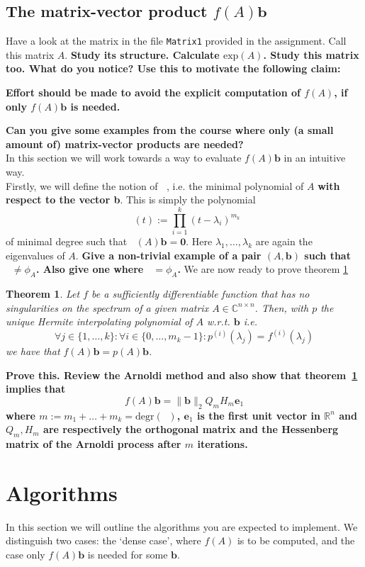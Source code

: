 \documentclass[12pt]{article}
\DeclareMathOperator{\phiAb}{\phi_{A,\mathbf{b}}}
\newtheorem{theorem}{Theorem}
\begin{document}
\subsection{The matrix-vector product $f(A)\mathbf{b}$}
Have a look at the matrix in the file \texttt{Matrix1} provided in the assignment. Call this matrix $A$. \textbf{Study its structure. Calculate $\text{exp}(A)$. Study this matrix too. What do you notice? Use this to motivate the following claim:}
\begin{center}
\textbf{Effort should be made to avoid the explicit computation of $f(A)$, if only $f(A)\mathbf{b}$ is needed.}
\end{center}
\textbf{Can you give some examples from the course where only (a small amount of) matrix-vector products are needed?}\\
In this section we will work towards a way to evaluate $f(A)\mathbf{b}$ in an intuitive way.\\
Firstly, we will define the notion of $\phiAb$, i.e. the minimal polynomial of $A$ \textbf{with respect to the vector b}. This is simply the polynomial
\begin{equation}\label{eq:minPolyAb}
\phiAb(t):= \prod_{i=1}^{k}(t-\lambda_i)^{m_k}
\end{equation}
of minimal degree such that $\phiAb(A)\mathbf{b}=\mathbf{0}$. Here $\lambda_1,\ldots,\lambda_k$ are again the eigenvalues of $A$.
\textbf{Give a non-trivial example of a pair $(A,\mathbf{b})$ such that $\phiAb\neq \phi_A$. Also give one where $\phiAb = \phi_A$.} We are now ready to prove theorem \ref{thm:KrylovApprox}
\begin{theorem}\label{thm:KrylovApprox}
Let $f$ be a sufficiently differentiable function that has no singularities on the spectrum of a given matrix $A\in\mathbb{C}^{n \times n}$. Then, with $p$ the unique Hermite interpolating polynomial of $A$ w.r.t. $\mathbf{b}$ i.e. 
$$\forall j\in\{1,\ldots,k\}:\forall i\in\{0,\ldots,m_k-1\}:p^{(i)}(\lambda_j)=f^{(i)}(\lambda_j)$$
we have that $f(A)\mathbf{b}=p(A)\mathbf{b}$.
\end{theorem}
\textbf{Prove this. Review the Arnoldi method and also show that theorem~\ref{thm:KrylovApprox} implies that}
$$f(A)\mathbf{b}=\|\mathbf{b}\|_2Q_{m}H_m\mathbf{e}_1$$
\textbf{where $m:=m_1+\ldots + m_k=\text{degr}(\phiAb)$, $\mathbf{e}_1$ is the first unit vector in $\mathbb{R}^n$ and $Q_m, H_m$ are respectively the orthogonal matrix and the Hessenberg matrix of the Arnoldi process after $m$ iterations.}
\section{Algorithms}
In this section we will outline the algorithms you are expected to implement. We distinguish two cases: the `dense case', where $f(A)$ is to be computed, and the case only $f(A)\mathbf{b}$ is needed for some $\textbf{b}$.
\end{document}
